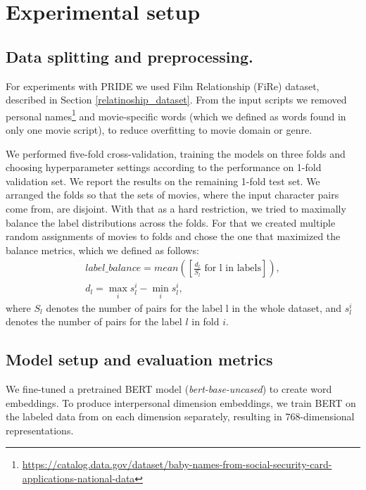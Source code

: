 \section{Experimental setup}

\subsection{Data splitting and preprocessing.} 
For experiments with PRIDE we used Film Relationship (FiRe) dataset, described in Section \ref{relatinoship_dataset}.
From the input scripts we removed personal names\footnote{
\href{https://catalog.data.gov/dataset/baby-names-from-social-security-card-applications-national-data}{\justify https://catalog.data.gov/dataset/baby-names-from-social-security-card-applications-national-data}} and movie-specific words (which we defined as words found in only one movie script), to reduce overfitting to movie domain or genre.

We performed five-fold cross-validation, training the models on three folds and choosing hyperparameter settings according to the performance on 1-fold validation set. We report the results on the remaining 1-fold test set. We arranged the folds so that the sets of movies, where the input character pairs come from, are disjoint. With that as a hard restriction, we tried to maximally balance the label distributions across the folds. For that we created multiple random assignments of movies to folds and chose the one that maximized the balance metrics, which we defined as follows:
\begin{gather*}
    label\_balance = mean([\frac{d_l}{S_l} \mbox{ for l in labels}]), \\
    d_l = \max_{i}s^i_l - \min_{i}s^i_l, 
\end{gather*}
where $S_l$ denotes the number of pairs for the label l in the whole dataset, and $s^i_l$ denotes the number of pairs for the label $l$ in fold $i$.


\subsection{Model setup and evaluation metrics}

We fine-tuned a pretrained \gls{BERT} model (\textit{bert-base-uncased}) to create word embeddings. To produce interpersonal dimension embeddings, we train BERT on the labeled data from \citet{rashid2018characterizing} on each dimension separately, resulting in 768-dimensional representations.

